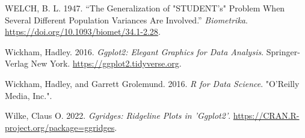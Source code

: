 \documentclass[
  a4paper,
]{scrbook}
\newlength{\cslhangindent}
\newenvironment{CSLReferences}[2] %
 {\begin{list}{}{%
  \setlength{\itemindent}{0pt}
  \setlength{\leftmargin}{0pt}
  \setlength{\parsep}{0pt}
  \ifodd #1
   \setlength{\leftmargin}{\cslhangindent}
   \setlength{\itemindent}{-1\cslhangindent}
  \fi
  \setlength{\itemsep}{#2\baselineskip}}}
 {\end{list}}
\begin{document}
\begin{CSLReferences}{1}{0}
WELCH, B. L. 1947. {``The Generalization of "STUDENT's" Problem When
Several Different Population Variances Are Involved.''}
\emph{Biometrika}. \url{https://doi.org/10.1093/biomet/34.1-2.28}.

Wickham, Hadley. 2016. \emph{Ggplot2: Elegant Graphics for Data
Analysis}. Springer-Verlag New York.
\url{https://ggplot2.tidyverse.org}.

Wickham, Hadley, and Garrett Grolemund. 2016. \emph{R for Data Science}.
"O'Reilly Media, Inc.".

Wilke, Claus O. 2022. \emph{Ggridges: Ridgeline Plots in 'Ggplot2'}.
\url{https://CRAN.R-project.org/package=ggridges}.

\end{CSLReferences}


\backmatter
\end{document}
